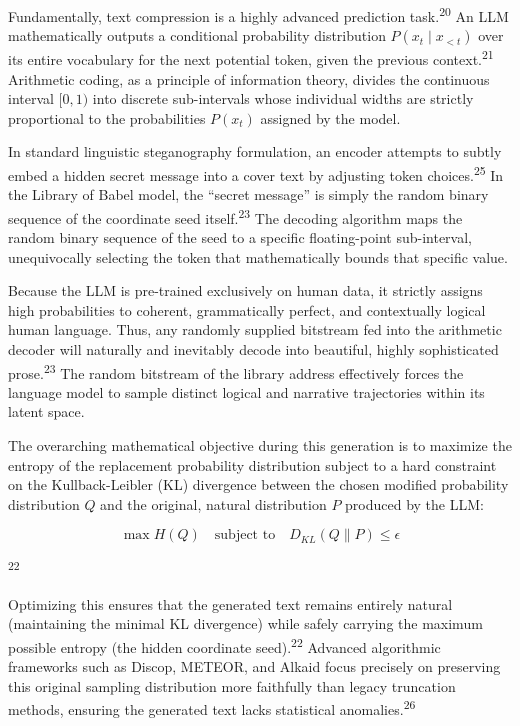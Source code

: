 \documentclass[
  11pt,
  a4paper,
]{article}
\begin{document}
Fundamentally, text compression is a highly advanced prediction task.\textsuperscript{20} An LLM mathematically outputs a conditional probability distribution \(P(x_t \mid x_{<t})\) over its entire vocabulary for the next potential token, given the previous context.\textsuperscript{21} Arithmetic coding, as a principle of information theory, divides the continuous interval \([0,1)\) into discrete sub-intervals whose individual widths are strictly proportional to the probabilities \(P(x_t)\) assigned by the model.

In standard linguistic steganography formulation, an encoder attempts to subtly embed a hidden secret message into a cover text by adjusting token choices.\textsuperscript{25} In the Library of Babel model, the ``secret message'' is simply the random binary sequence of the coordinate seed itself.\textsuperscript{23} The decoding algorithm maps the random binary sequence of the seed to a specific floating-point sub-interval, unequivocally selecting the token that mathematically bounds that specific value.

Because the LLM is pre-trained exclusively on human data, it strictly assigns high probabilities to coherent, grammatically perfect, and contextually logical human language. Thus, any randomly supplied bitstream fed into the arithmetic decoder will naturally and inevitably decode into beautiful, highly sophisticated prose.\textsuperscript{23} The random bitstream of the library address effectively forces the language model to sample distinct logical and narrative trajectories within its latent space.

The overarching mathematical objective during this generation is to maximize the entropy of the replacement probability distribution subject to a hard constraint on the Kullback-Leibler (KL) divergence between the chosen modified probability distribution \(Q\) and the original, natural distribution \(P\) produced by the LLM:

\[
\max H(Q) \quad \text{subject to} \quad D_{KL}(Q \parallel P) \leq \epsilon
\]

\textsuperscript{22}

Optimizing this ensures that the generated text remains entirely natural (maintaining the minimal KL divergence) while safely carrying the maximum possible entropy (the hidden coordinate seed).\textsuperscript{22} Advanced algorithmic frameworks such as Discop, METEOR, and Alkaid focus precisely on preserving this original sampling distribution more faithfully than legacy truncation methods, ensuring the generated text lacks statistical anomalies.\textsuperscript{26}
\end{document}
